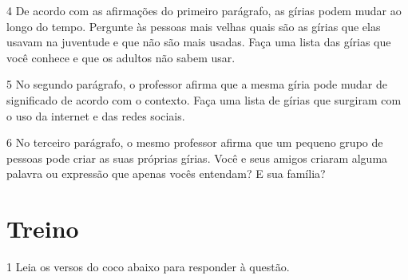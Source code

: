 \num{4} De acordo com as afirmações do primeiro parágrafo, as gírias podem
mudar ao longo do tempo. Pergunte às pessoas mais velhas quais são as 
gírias que elas usavam na juventude e que não são mais usadas. Faça uma
lista das gírias que você conhece e que os adultos não sabem usar. 

\num{5} No segundo parágrafo, o professor afirma que a mesma gíria pode
mudar de significado de acordo com o contexto. Faça uma lista de gírias
que surgiram com o uso da internet e das redes sociais.

\num{6} No terceiro parágrafo, o mesmo professor afirma que um pequeno
grupo de pessoas pode criar as suas próprias gírias. Você e seus amigos 
criaram alguma palavra ou expressão que apenas vocês entendam? E sua 
família? 

\section*{Treino}

\num{1} Leia os versos do coco abaixo para responder à questão.


